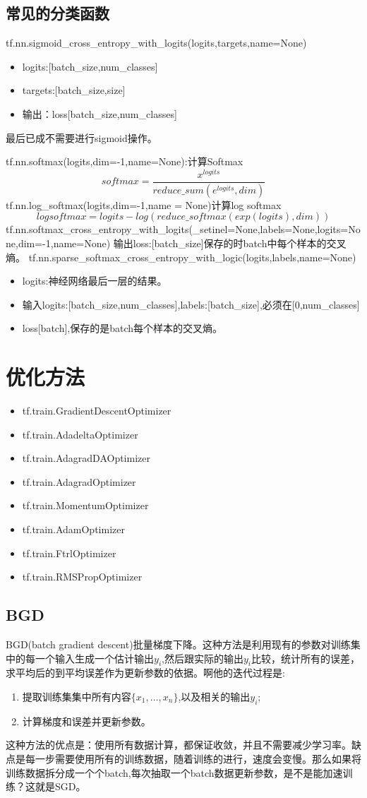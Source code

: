 \subsection{常见的分类函数}
tf.nn.sigmoid\_cross\_entropy\_with\_logits(logits,targets,name=None)
\begin{itemize}
	\item logits:[batch\_size,num\_classes]
	\item targets:[batch\_size,size]
	\item 输出：loss[batch\_size,num\_classes]
\end{itemize}
最后已成不需要进行sigmoid操作。\par
tf.nn.softmax(logits,dim=-1,name=None):计算Softmax
\[softmax = \frac{x^{logits}}{reduce\_sum(e^{logits},dim)}\]
tf.nn.log\_softmax(logits,dim=-1,name = None)计算log softmax
\[logsoftmax = logits-log(reduce\_softmax(exp(logits),dim))\]
tf.nn.softmax\_cross\_entropy\_with\_logits(\_setinel=None,labels=None,logits=None,dim=-1,name=None)
输出loss:[batch\_size]保存的时batch中每个样本的交叉熵。
tf.nn.sparse\_softmax\_cross\_entropy\_with\_logic(logits,labels,name=None)
\begin{itemize}
	\item logits:神经网络最后一层的结果。
	\item 输入logits:[batch\_size,num\_classes],labels:[batch\_size],必须在[0,num\_classes]
	\item loss[batch],保存的是batch每个样本的交叉熵。
\end{itemize}
\section{优化方法}
\begin{itemize}
	\item tf.train.GradientDescentOptimizer
	\item tf.train.AdadeltaOptimizer
	\item tf.train.AdagradDAOptimizer
	\item tf.train.AdagradOptimizer
	\item tf.train.MomentumOptimizer
	\item tf.train.AdamOptimizer
	\item tf.train.FtrlOptimizer
	\item tf.train.RMSPropOptimizer
\end{itemize}
\subsection{BGD}
BGD(batch gradient descent)批量梯度下降。这种方法是利用现有的参数对训练集中的每一个输入生成一个估计输出$y_i$,然后跟实际的输出$y_i$比较，统计所有的误差，求平均后的到平均误差作为更新参数的依据。啊他的迭代过程是:
\begin{enumerate}
	\item 提取训练集集中所有内容$\{x_1,\ldots,x_n\}$,以及相关的输出$y_i$;
	\item 计算梯度和误差并更新参数。
\end{enumerate}
这种方法的优点是：使用所有数据计算，都保证收敛，并且不需要减少学习率。缺点是每一步需要使用所有的训练数据，随着训练的进行，速度会变慢。那么如果将训练数据拆分成一个个batch,每次抽取一个batch数据更新参数，是不是能加速训练？这就是SGD。
